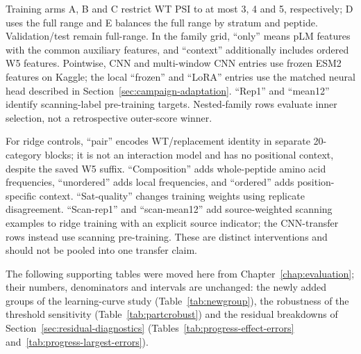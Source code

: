 Training arms A, B and C restrict WT PSI to at most 3, 4 and 5, respectively; D uses the full range
and E balances the full range by stratum and peptide. Validation/test remain full-range. In the family
grid, ``only'' means pLM features with the common auxiliary features, and ``context'' additionally
includes ordered W5 features. Pointwise, CNN and multi-window CNN entries use frozen ESM2 features
on Kaggle; the local ``frozen'' and ``LoRA'' entries use the matched neural head described in
Section~\ref{sec:campaign-adaptation}. ``Rep1'' and ``mean12'' identify scanning-label pre-training
targets. Nested-family rows evaluate inner selection, not a retrospective outer-score winner.

For ridge controls, ``pair'' encodes WT/replacement identity in separate 20-category blocks;
it is not an interaction model and has no positional context, despite the saved W5 suffix.
``Composition'' adds whole-peptide amino acid frequencies, ``unordered'' adds local frequencies,
and ``ordered'' adds position-specific context. ``Sat-quality'' changes training weights using
replicate disagreement. ``Scan-rep1'' and ``scan-mean12'' add source-weighted scanning examples
to ridge training with an explicit source indicator; the CNN-transfer rows instead use scanning
pre-training. These are distinct interventions and should not be pooled into one transfer claim.




The following supporting tables were moved here from Chapter~\ref{chap:evaluation}; their numbers,
denominators and intervals are unchanged: the newly added groups of the learning-curve study
(Table~\ref{tab:newgroup}), the robustness of the threshold sensitivity (Table~\ref{tab:partcrobust}) and
the residual breakdowns of Section~\ref{sec:residual-diagnostics} (Tables~\ref{tab:progress-effect-errors}
and~\ref{tab:progress-largest-errors}).

\begin{table}[htbp]
  \centering
  \caption[Cells of the benchmark peptides and of the 85 peptides added by relaxing the threshold]{Cells of the benchmark peptides and of the 85 peptides added by relaxing the threshold}\label{tab:newgroup}
  
\end{table}

\begin{table}[htbp]
  \centering
  \caption{Robustness of the gain at threshold 4.0 (ridge M3)}\label{tab:partcrobust}
  
\end{table}

